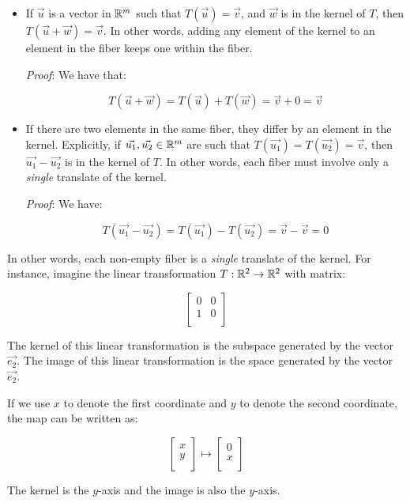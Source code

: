 \documentclass[10pt]{amsart}
\begin{document}
\begin{itemize}
\item If $\vec{u}$ is a vector in $\mathbb{R}^m$ such that $T(\vec{u}) =
  \vec{v}$, and $\vec{w}$ is in the kernel of $T$, then $T(\vec{u} +
  \vec{w})= \vec{v}$. In other words, adding any element of the
  kernel to an element in the fiber keeps one within the fiber.

  {\em Proof}: We have that:

  $$T(\vec{u} + \vec{w}) = T(\vec{u}) + T(\vec{w}) = \vec{v} + 0 = \vec{v}$$

\item If there are two elements in the same fiber, they differ by an
  element in the kernel. Explicitly, if $\vec{u_1}, \vec{u_2} \in
  \mathbb{R}^m$ are such that $T(\vec{u_1}) = T(\vec{u_2}) = \vec{v}$, then
  $\vec{u_1} - \vec{u_2}$ is in the kernel of $T$. In other words,
  each fiber must involve only a {\em single} translate of the kernel.

  {\em Proof}: We have:

  $$T(\vec{u_1} - \vec{u_2}) = T(\vec{u_1}) - T(\vec{u_2}) = \vec{v} - \vec{v} = 0$$
\end{itemize}

In other words, each non-empty fiber is a {\em single} translate of
the kernel. For instance, imagine the linear transformation $T:\mathbb{R}^2
\to \mathbb{R}^2$ with matrix:

$$\left[\begin{matrix} 0 & 0  \\ 1 & 0 \\\end{matrix}\right]$$

The kernel of this linear transformation is the subspace generated by
the vector $\vec{e_2}$. The image of this linear transformation is the
space generated by the vector $\vec{e_2}$.

If we use $x$ to denote the first coordinate and $y$ to denote the
second coordinate, the map can be written as:

$$\left[\begin{matrix} x \\ y \\ \end{matrix}\right] \mapsto \left[\begin{matrix} 0 \\ x \\\end{matrix}\right]$$

The kernel is the $y$-axis and the image is also the $y$-axis.
\end{document}
